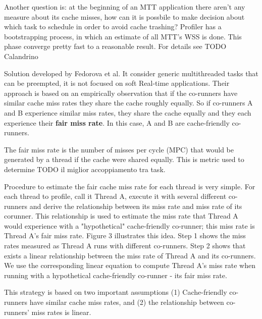 \documentclass[a4paper,10pt]{article}
\begin{document}
\begin{multicols}{2}
Another question is: at the beginning of an MTT application there aren't any measure about its cache misses, how can it is possbile to make decision 
about which task to schedule in order to avoid cache trashing?
Profiler has a bootstrapping process, in which an estimate of all MTT's WSS is done. This phase converge pretty fast to a reasonable result.
For details see TODO Calandrino 

Solution developed by Fedorova et al. It consider generic multithreaded tasks that can be preempted, it is not focused on soft Real-time applications.
Their approach is based on an empirically observation that if the co-runners have similar cache miss rates they share the cache
roughly equally. So if co-runners A and B experience similar miss rates, they share the cache equally and they each experience their
\textbf{fair miss rate}. In this case, A and B are cache-friendly co-runners.

The fair miss rate is the number of misses per cycle (MPC) that would be generated by a thread if the cache were shared equally. This is metric used
to determine TODO il miglior accoppiamento tra task.

Procedure to estimate the fair cache miss rate for each thread is very simple.
For each thread to profile, call it Thread A, execute it with several different co-runners and derive the relationship between its miss rate and 
miss rate of its corunner. This relationship is used to estimate the miss rate that Thread A would experience with a "hypothetical" 
cache-friendly co-runner; this miss rate is Thread A's fair miss rate. Figure 3 illustrates this idea. Step 1 shows the miss rates measured as Thread A
runs with different co-runners. Step 2 shows that exists a linear relationship between the miss rate of Thread A and its co-runners.
We use the corresponding linear equation to compute Thread A's miss rate when running with a hypothetical cache-friendly co-runner - its fair miss 
rate.

This strategy is based on two important assumptions (1) Cache-friendly co-runners have similar cache miss rates, and 
(2) the relationship between co-runners' miss rates is linear.


\end{multicols}
\end{document}
